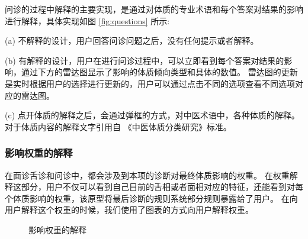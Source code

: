 问诊的过程中解释的主要实现，是通过对体质的专业术语和每个答案对结果的影响进行解释，具体实现如图 \ref{fig:questions} 所示:

(a) 不解释的设计，用户回答问诊问题之后，没有任何提示或者解释。

(b) 有解释的设计，用户在进行问诊过程中，可以立即看到每个答案对结果的影响，通过下方的雷达图显示了影响的体质倾向类型和具体的数值。
雷达图的更新是实时根据用户的选择进行更新的，用户可以通过点击不同的选项查看不同选项对应的雷达图。

(c) 点开体质的解释之后，会通过弹框的方式，对中医术语中，各种体质的解释。对于体质内容的解释文字引用自 《中医体质分类研究》标准\cite{王琦20099}。

\subsubsection{影响权重的解释}
在面诊舌诊和问诊中，都会涉及到本项的诊断对最终体质影响的权重。
在权重解释这部分，用户不仅可以看到自己目前的舌相或者面相对应的特征，还能看到对每个体质影响的权重，该原型将最后诊断的规则系统部分规则暴露给了用户。
在向用户解释这个权重的时候，我们使用了图表的方式向用户解释权重。
\begin{figure}[h]
    \centering
    \caption{影响权重的解释}
    \label{fig:question_weight}
\end{figure}

